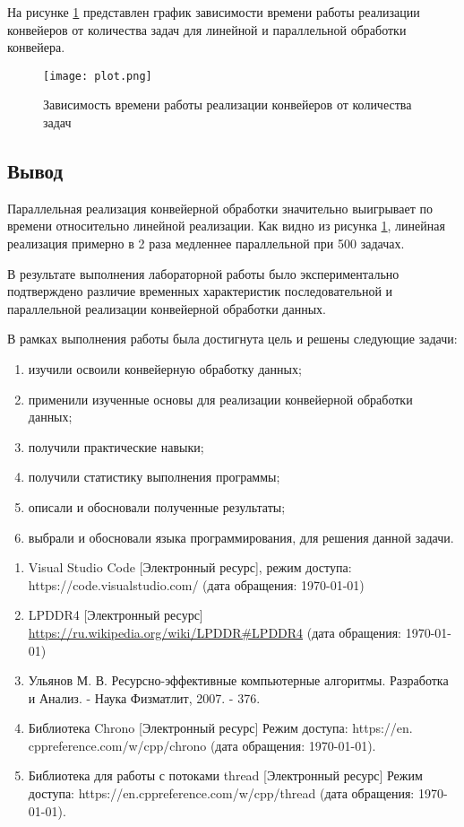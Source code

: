 На рисунке \ref{img:plot} представлен график зависимости времени работы реализации конвейеров от количества задач для линейной и параллельной обработки конвейера.

\begin{figure}[H]
    \centering
    \texttt{[image: plot.png]}
    \caption{Зависимость времени работы реализации конвейеров от количества задач}
    \label{img:plot}
\end{figure}

\subsection{Вывод}

Параллельная реализация конвейерной обработки значительно выигрывает по времени относительно линейной реализации. Как видно из рисунка \ref{img:plot}, линейная реализация примерно в 2 раза медленнее параллельной при 500 задачах.



В результате выполнения лабораторной работы было экспериментально подтверждено различие временных характеристик последовательной и параллельной реализации конвейерной обработки данных.

В рамках выполнения работы была достигнута цель и решены следующие задачи:

\begin{enumerate}
	\item изучили освоили конвейерную обработку данных;
	\item применили изученные основы для реализации конвейерной обработки данных;
	\item получили практические навыки;
	\item получили статистику выполнения программы;
	\item описали и обосновали полученные результаты;
	\item выбрали и обосновали языка программирования, для решения данной задачи.
\end{enumerate}


\begin{enumerate}
	\item Visual Studio Code [Электронный ресурс], режим доступа: https://code.visualstudio.com/ (дата обращения: \today)
	\item LPDDR4 [Электронный ресурс] \url{https://ru.wikipedia.org/wiki/LPDDR#LPDDR4} (дата обращения: \today)
	\item Ульянов М. В. Ресурсно-эффективные компьютерные алгоритмы. Разработка и Анализ. - Наука Физматлит, 2007. - 376.
	\item Библиотека Chrono [Электронный ресурс] Режим доступа: https://en. cppreference.com/w/cpp/chrono (дата обращения: \today).
	\item Библиотека для работы с потоками thread [Электронный ресурс] Режим доступа: https://en.cppreference.com/w/cpp/thread (дата обращения: \today).
\end{enumerate}




